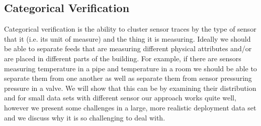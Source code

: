 \subsection{Categorical Verification}
Categorical verification is the ability to cluster sensor traces by the type of sensor that it (i.e. its unit of measure) and the thing it is measuring.
Ideally we should be able to separate feeds that are measuring different physical attributes and/or are placed in different parts of the building.
For example, if there are sensors measuring temperature in a pipe and temperature in a room we should be able to separate them from one another as well
as separate them from sensor pressuring pressure in a valve.  We will show that this can be by examining their distribution and for 
small data sets with different sensor our approach works quite well, however we present some challenges in a large, more realistic deployment
data set and we discuss why it is so challenging to deal with.




